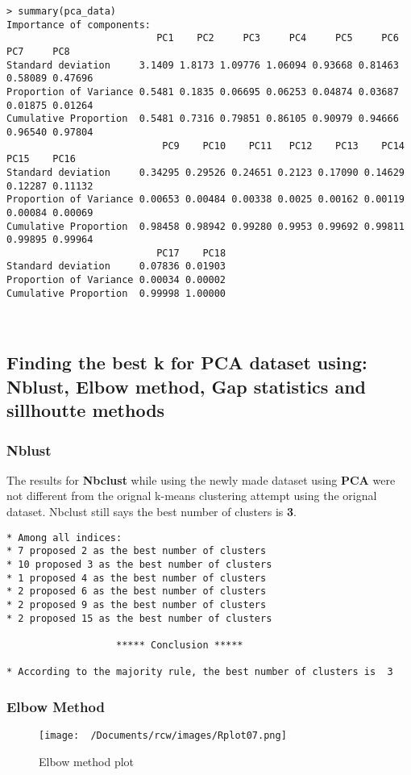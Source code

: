 \documentclass[11pt]{article}
\begin{document}
\begin{lstlisting}
> summary(pca_data)
Importance of components:
                          PC1    PC2     PC3     PC4     PC5     PC6     PC7     PC8
Standard deviation     3.1409 1.8173 1.09776 1.06094 0.93668 0.81463 0.58089 0.47696
Proportion of Variance 0.5481 0.1835 0.06695 0.06253 0.04874 0.03687 0.01875 0.01264
Cumulative Proportion  0.5481 0.7316 0.79851 0.86105 0.90979 0.94666 0.96540 0.97804
                           PC9    PC10    PC11   PC12    PC13    PC14    PC15    PC16
Standard deviation     0.34295 0.29526 0.24651 0.2123 0.17090 0.14629 0.12287 0.11132
Proportion of Variance 0.00653 0.00484 0.00338 0.0025 0.00162 0.00119 0.00084 0.00069
Cumulative Proportion  0.98458 0.98942 0.99280 0.9953 0.99692 0.99811 0.99895 0.99964
                          PC17    PC18
Standard deviation     0.07836 0.01903
Proportion of Variance 0.00034 0.00002
Cumulative Proportion  0.99998 1.00000
\end{lstlisting}
\\
\subsection{Finding the best k for PCA dataset using: Nblust, Elbow method, Gap statistics and sillhoutte methods}

\subsubsection{Nblust}
The results for \textbf{Nbclust} while using the newly made dataset using \textbf{PCA} were not different from the orignal k-means clustering attempt using the orignal dataset. 
Nbclust still says the best number of clusters is \textbf{3}.
\begin{lstlisting}
* Among all indices:                                                
* 7 proposed 2 as the best number of clusters 
* 10 proposed 3 as the best number of clusters 
* 1 proposed 4 as the best number of clusters 
* 2 proposed 6 as the best number of clusters 
* 2 proposed 9 as the best number of clusters 
* 2 proposed 15 as the best number of clusters 

                   ***** Conclusion *****                            
 
* According to the majority rule, the best number of clusters is  3 
\end{lstlisting}

\subsubsection{Elbow Method}
\begin{figure}[H]
  \centering
  \texttt{[image: ~/Documents/rcw/images/Rplot07.png]}
  \caption{Elbow method plot}
\end{figure}
\end{document}

